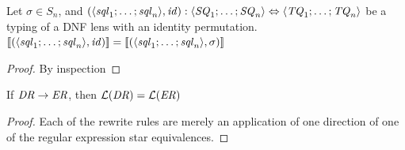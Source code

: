 \documentclass[numbers]{sigplanconf}
\begin{document}
\begin{lemma}
  \label{lem:dnfl-perm-sem-ineffective}
  Let $\sigma\in S_n$, and
  $(\langle\mathit{sql}_1;\ldots;\mathit{sql}_n\rangle,\mathit{id}) :
  \langle\mathit{SQ}_1;\ldots;\mathit{SQ}_n\rangle \Leftrightarrow
  \langle\mathit{TQ}_1;\ldots;\mathit{TQ}_n\rangle$ be a typing of a DNF lens with
  an identity permutation.
  $[ \! [(\langle\mathit{sql}_1;\ldots;\mathit{sql}_n\rangle,\mathit{id})] \! ]
  =[ \! [(\langle\mathit{sql}_1;\ldots;\mathit{sql}_n\rangle,\sigma)] \! ]$
\end{lemma}
\begin{proof}
  By inspection
\end{proof}

\begin{lemma}
  \label{lem:rrl}
  If $\mathit{DR}\rightarrow\mathit{ER}$, then $\mathcal{L}(\mathit{DR})=\mathcal{L}(\mathit{ER})$
\end{lemma}
\begin{proof}
  Each of the rewrite rules are merely an application of one direction of one of
  the regular expression star equivalences.
\end{proof}
\end{document}
